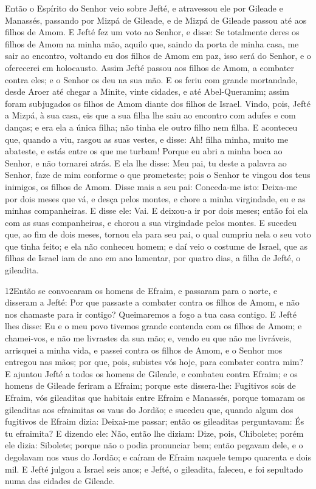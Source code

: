 Então o Espírito do Senhor veio sobre Jefté, e atravessou ele por
Gileade e Manassés, passando por Mizpá de Gileade, e de Mizpá de
Gileade passou até aos filhos de Amom. E Jefté fez um voto ao
Senhor, e disse: Se totalmente deres os filhos de Amom na minha mão,
aquilo que, saindo da porta de minha casa, me sair ao
encontro, voltando eu dos filhos de Amom em paz, isso será do
Senhor, e o oferecerei em holocausto. Assim Jefté passou aos
filhos de Amom, a combater contra eles; e o Senhor os deu na sua
mão. E os feriu com grande mortandade, desde Aroer até chegar
a Minite, vinte cidades, e até Abel-Queramim; assim foram subjugados
os filhos de Amom diante dos filhos de Israel. Vindo, pois,
Jefté a Mizpá, à sua casa, eis que a sua filha lhe saiu ao encontro
com adufes e com danças; e era ela a única filha; não tinha ele
outro filho nem filha. E aconteceu que, quando a viu, rasgou
as suas vestes, e disse: Ah! filha minha, muito me abateste, e estás
entre os que me turbam! Porque eu abri a minha boca ao Senhor, e não
tornarei atrás. E ela lhe disse: Meu pai, tu deste a palavra
ao Senhor, faze de mim conforme o que prometeste; pois o Senhor te
vingou dos teus inimigos, os filhos de Amom. Disse mais a seu
pai: Conceda-me isto: Deixa-me por dois meses que vá, e desça pelos
montes, e chore a minha virgindade, eu e as minhas companheiras.
E disse ele: Vai. E deixou-a ir por dois meses; então foi ela
com as suas companheiras, e chorou a sua virgindade pelos montes.
E sucedeu que, ao fim de dois meses, tornou ela para seu pai,
o qual cumpriu nela o seu voto que tinha feito; e ela não conheceu
homem; e daí veio o costume de Israel, que as filhas de
Israel iam de ano em ano lamentar, por quatro dias, a filha de
Jefté, o gileadita.

\medskip

\lettrine{12} Então se convocaram os homens de Efraim, e
passaram para o norte, e disseram a Jefté: Por que passaste a
combater contra os filhos de Amom, e não nos chamaste para ir
contigo? Queimaremos a fogo a tua casa contigo. E Jefté lhes
disse: Eu e o meu povo tivemos grande contenda com os filhos de
Amom; e chamei-vos, e não me livrastes da sua mão; e, vendo eu
que não me livráveis, arrisquei a minha vida, e passei contra os
filhos de Amom, e o Senhor mos entregou nas mãos; por que, pois,
subistes vós hoje, para combater contra mim? E ajuntou Jefté a
todos os homens de Gileade, e combateu contra Efraim; e os homens de
Gileade feriram a Efraim; porque este dissera-lhe: Fugitivos sois de
Efraim, vós gileaditas que habitais entre Efraim e Manassés,
porque tomaram os gileaditas aos efraimitas os vaus do Jordão; e
sucedeu que, quando algum dos fugitivos de Efraim dizia: Deixai-me
passar; então os gileaditas perguntavam: És tu efraimita? E dizendo
ele: Não, então lhe diziam: Dize, pois, Chibolete; porém ele
dizia: Sibolete; porque não o podia pronunciar bem; então pegavam
dele, e o degolavam nos vaus do Jordão; e caíram de Efraim naquele
tempo quarenta e dois mil. E Jefté julgou a Israel seis anos; e
Jefté, o gileadita, faleceu, e foi sepultado numa das cidades de
Gileade.

